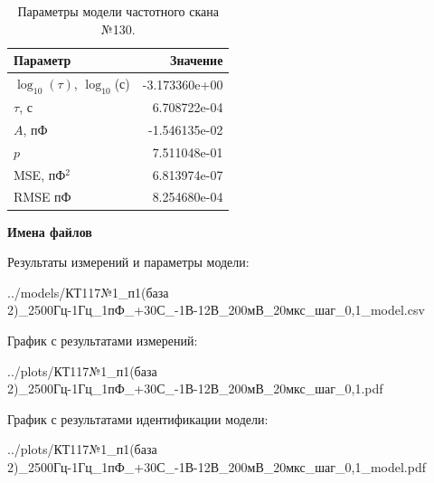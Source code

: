 \begin{table}[!ht]
    \centering
    \caption{Параметры модели частотного скана №130.}
    \begin{tabular}{|l|r|}
        \hline
        Параметр                                       & Значение                  \\ \hline
        $\log_{10}(\tau)$, $\log_{10}$(с)              & -3.173360e+00             \\ \hline
        $\tau$, с                                      & 6.708722e-04              \\ \hline
        $A$, пФ                                        & -1.546135e-02             \\ \hline
        $p$                                            & 7.511048e-01              \\ \hline
        MSE, пФ$^2$                                    & 6.813974e-07              \\ \hline
        RMSE пФ                                        & 8.254680e-04              \\ \hline
    \end{tabular}
    \label{table:frequency_scan_model_130}
\end{table}

\textbf{Имена файлов}

Результаты измерений и параметры модели:

\scriptsize../models/КТ117№1\_п1(база 2)\_2500Гц-1Гц\_1пФ\_+30С\_-1В-12В\_200мВ\_20мкс\_шаг\_0,1\_model.csv
\normalsize

График с результатами измерений:

\scriptsize../plots/КТ117№1\_п1(база 2)\_2500Гц-1Гц\_1пФ\_+30С\_-1В-12В\_200мВ\_20мкс\_шаг\_0,1.pdf
\normalsize

График с результатами идентификации модели:

\scriptsize../plots/КТ117№1\_п1(база 2)\_2500Гц-1Гц\_1пФ\_+30С\_-1В-12В\_200мВ\_20мкс\_шаг\_0,1\_model.pdf
\normalsize

